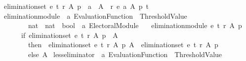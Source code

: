 \begin{isabellebody}
\ {\isachardoublequoteopen}elimination{\isacharunderscore}{\kern0pt}set\ e\ t\ r\ A\ p\ {\isacharequal}{\kern0pt}\ {\isacharbraceleft}{\kern0pt}a\ {\isasymin}\ A\ {\isachardot}{\kern0pt}\ r\ {\isacharparenleft}{\kern0pt}e\ a\ A\ p{\isacharparenright}{\kern0pt}\ t\ {\isacharbraceright}{\kern0pt}{\isachardoublequoteclose}\isanewline
\isanewline
{}\isamarkupfalse%
\ elimination{\isacharunderscore}{\kern0pt}module\ {\isacharcolon}{\kern0pt}{\isacharcolon}{\kern0pt}\ {\isachardoublequoteopen}{\isacharprime}{\kern0pt}a\ Evaluation{\isacharunderscore}{\kern0pt}Function\ {\isasymRightarrow}\ Threshold{\isacharunderscore}{\kern0pt}Value\ {\isasymRightarrow}\isanewline
\ \ \ \ \ \ \ \ {\isacharparenleft}{\kern0pt}nat\ {\isasymRightarrow}\ nat\ {\isasymRightarrow}\ bool{\isacharparenright}{\kern0pt}\ {\isasymRightarrow}\ {\isacharprime}{\kern0pt}a\ Electoral{\isacharunderscore}{\kern0pt}Module{\isachardoublequoteclose}\ \isanewline
\ \ {\isachardoublequoteopen}elimination{\isacharunderscore}{\kern0pt}module\ e\ t\ r\ A\ p\ {\isacharequal}{\kern0pt}\isanewline
\ \ \ \ \ \ {\isacharparenleft}{\kern0pt}if\ {\isacharparenleft}{\kern0pt}elimination{\isacharunderscore}{\kern0pt}set\ e\ t\ r\ A\ p{\isacharparenright}{\kern0pt}\ {\isasymnoteq}\ A\isanewline
\ \ \ \ \ \ \ \ then\ {\isacharparenleft}{\kern0pt}{\isacharbraceleft}{\kern0pt}{\isacharbraceright}{\kern0pt}{\isacharcomma}{\kern0pt}\ {\isacharparenleft}{\kern0pt}elimination{\isacharunderscore}{\kern0pt}set\ e\ t\ r\ A\ p{\isacharparenright}{\kern0pt}{\isacharcomma}{\kern0pt}\ A\ {\isacharminus}{\kern0pt}\ {\isacharparenleft}{\kern0pt}elimination{\isacharunderscore}{\kern0pt}set\ e\ t\ r\ A\ p{\isacharparenright}{\kern0pt}{\isacharparenright}{\kern0pt}\isanewline
\ \ \ \ \ \ \ \ else\ {\isacharparenleft}{\kern0pt}{\isacharbraceleft}{\kern0pt}{\isacharbraceright}{\kern0pt}{\isacharcomma}{\kern0pt}{\isacharbraceleft}{\kern0pt}{\isacharbraceright}{\kern0pt}{\isacharcomma}{\kern0pt}A{\isacharparenright}{\kern0pt}{\isacharparenright}{\kern0pt}{\isachardoublequoteclose}%
\isadelimdocument
%
\endisadelimdocument
%
\isatagdocument
%
\isamarkuptrue%
%
\endisatagdocument
{\isafolddocument}%
%
\isadelimdocument
%
\endisadelimdocument
{}\isamarkupfalse%
\ less{\isacharunderscore}{\kern0pt}eliminator\ {\isacharcolon}{\kern0pt}{\isacharcolon}{\kern0pt}\ {\isachardoublequoteopen}{\isacharprime}{\kern0pt}a\ Evaluation{\isacharunderscore}{\kern0pt}Function\ {\isasymRightarrow}\ Threshold{\isacharunderscore}{\kern0pt}Value\ {\isasymRightarrow}\isanewline

\end{isabellebody}
